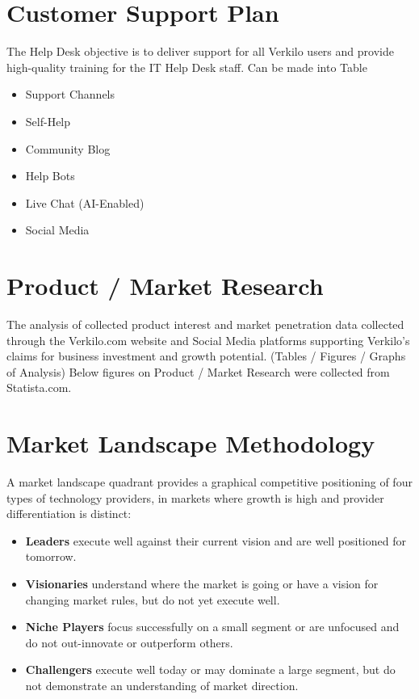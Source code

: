 \documentclass[10pt,openany]{book}
\providecommand{\tightlist}{%
  \setlength{\itemsep}{0pt}\setlength{\parskip}{0pt}}
\begin{document}
\hypertarget{customer-support-plan}{%
\section{Customer Support Plan}\label{customer-support-plan}}

The Help Desk objective is to deliver support for all Verkilo users and
provide high-quality training for the IT Help Desk staff. Can be made
into Table

\begin{itemize}
\tightlist
\item
  Support Channels
\item
  Self-Help
\item
  Community Blog
\item
  Help Bots
\item
  Live Chat (AI-Enabled)
\item
  Social Media
\end{itemize}

\hypertarget{product-market-research}{%
\section{Product / Market Research}\label{product-market-research}}

The analysis of collected product interest and market penetration data
collected through the Verkilo.com website and Social Media platforms
supporting Verkilo's claims for business investment and growth
potential. (Tables / Figures / Graphs of Analysis) Below figures on
Product / Market Research were collected from Statista.com.

\hypertarget{market-landscape-methodology}{%
\section{Market Landscape
Methodology}\label{market-landscape-methodology}}

A market landscape quadrant provides a graphical competitive positioning
of four types of technology providers, in markets where growth is high
and provider differentiation is distinct:

\begin{itemize}
\item
  \textbf{Leaders} execute well against their current vision and are
  well positioned for tomorrow.
\item
  \textbf{Visionaries} understand where the market is going or have a
  vision for changing market rules, but do not yet execute well.
\item
  \textbf{Niche Players} focus successfully on a small segment or are
  unfocused and do not out-innovate or outperform others.
\item
  \textbf{Challengers} execute well today or may dominate a large
  segment, but do not demonstrate an understanding of market direction.
\end{itemize}
\end{document}
